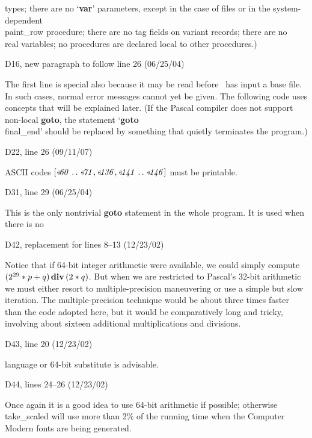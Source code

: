 {{\tenpoint\noindent
types; there are no `{\bf var}' parameters, except in the case of files
or in the system-dependent \\{paint\_row} procedure;
there are no tag fields on variant records; there are no \\{real} variables;
no procedures are declared local to other procedures.)

\bugonpage D16, new paragraph to follow line 26 (06/25/04)

The first line is special also because it may be read before \MF\ has
input a base file. In such cases, normal error messages cannot yet
be given. The following code uses concepts that will be explained later.
(If the Pascal compiler does not support non-local {\bf goto}, the
statement `{\bf goto} \\{final\_end}' should be replaced by something that
quietly terminates the program.)

\bugonpage D22, line 26 (09/11/07)

\noindent
ASCII codes $[\Oct{60}\to\Oct{71},%
\Oct{136},\Oct{141}\to\Oct{146}]$
must be printable.

\bugonpage D31, line 29 (06/25/04)

\noindent
This is the only nontrivial {\bf goto}  statement in the
whole program. It is used when there is no\cutpar

\bugonpage D42, replacement for lines 8--13 (12/23/02)

\tenpoint\noindent\quad
Notice that if 64-bit integer arithmetic were available,
we could simply compute $(2^{29}*p+\nobreak q)\allowbreak\,
\hbox{\bf div}\,(2*q)$.
But when we are restricted to Pascal's 32-bit arithmetic we
must either resort to multiple-precision maneuvering
or use a simple but slow iteration. The multiple-precision technique
would be about three times faster than the code adopted here, but it
would be comparatively long and tricky, involving about sixteen
additional multiplications and divisions.

\bugonpage D43, line 20 (12/23/02)

\tenpoint\noindent
language or 64-bit substitute is advisable.

\bugonpage D44, lines 24--26 (12/23/02)

\tenpoint\noindent\quad
Once again it is a good idea to use 64-bit arithmetic if
possible; otherwise \\{take\_scaled} will use more than 2\% of the running time
when the Computer Modern fonts are being generated.

}}
